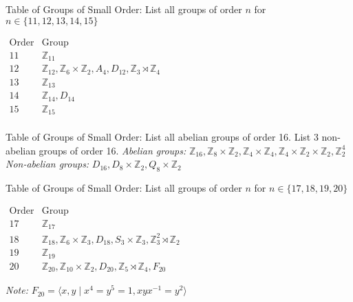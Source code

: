\documentclass[avery5371,grid]{flashcards}
\newcommand{\Z}{\mathbb{Z}}
\newcommand{\inv}{^{-1}}
\begin{document}
\begin{flashcard}[Groups]{Table of Groups of Small Order: List all groups of order $n$ for $n \in \{11, 12, 13, 14, 15 \}$}
 {\def\arraystretch{1.5}
 \begin{center} $\begin{array}{c|c}
      \text{Order} & \text{Group} \\
      \hline
      11 & \Z_{11} \\
      12 & \Z_{12}, \Z_{6} \times \Z_{2}, A_4, D_{12}, \Z_{3} \rtimes \Z_{4} \\
      13 & \Z_{13} \\
      14 & \Z_{14}, D_{14} \\
      15 & \Z_{15} \\
 \end{array}$ \end{center} }
\end{flashcard}

\begin{flashcard}[Groups]{Table of Groups of Small Order: List all abelian groups of order 16. List 3 non-abelian groups of order 16.}
 \emph{Abelian groups: } $\Z_{16}, \Z_8 \times \Z_2, \Z_4 \times \Z_4, \Z_4 \times \Z_2 \times \Z_2, \Z_2^4$\\
 
 \emph{Non-abelian groups: } $D_{16}, D_{8} \times \Z_2, Q_8 \times \Z_2$
\end{flashcard}

\begin{flashcard}[Groups]{Table of Groups of Small Order: List all groups of order $n$ for $n \in \{17, 18, 19, 20 \}$}
 {\def\arraystretch{1.5}
 \begin{center} $\begin{array}{c|c}
      \text{Order} & \text{Group} \\
      \hline
      17 & \Z_{17} \\
      18 & \Z_{18}, \Z_6 \times \Z_3, D_{18}, S_3 \times \Z_3, \Z_3^2 \rtimes \Z_2 \\
      19 & \Z_{19} \\
      20 & \Z_{20}, \Z_{10} \times \Z_2, D_{20}, \Z_5 \rtimes \Z_4, F_{20}
 \end{array}$ \end{center} }
 \emph{Note: }$F_{20} = \langle x,y \mid x^4 = y^5 = 1, xyx \inv = y^2 \rangle$
\end{flashcard}
\end{document}
